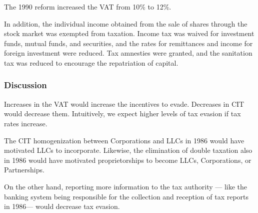 \documentclass[
  12pt]{article}
\theoremstyle{definition}
\theoremstyle{remark}
\begin{document}
The 1990 reform increased the VAT from 10\% to 12\%.

In addition, the individual income obtained from the sale of shares
through the stock market was exempted from taxation. Income tax was
waived for investment funds, mutual funds, and securities, and the rates
for remittances and income for foreign investment were reduced. Tax
amnesties were granted, and the sanitation tax was reduced to encourage
the repatriation of capital.

\subsubsection{Discussion}\label{discussion-2}

Increases in the VAT would increase the incentives to evade. Decreases
in CIT would decrease them. Intuitively, we expect higher levels of tax
evasion if tax rates increase.

The CIT homogenization between Corporations and LLCs in 1986 would have
motivated LLCs to incorporate. Likewise, the elimination of double
taxation also in 1986 would have motivated proprietorships to become
LLCs, Corporations, or Partnerships.

On the other hand, reporting more information to the tax authority ---
like the banking system being responsible for the collection and
reception of tax reports in 1986--- would decrease tax evasion.

\begin{table}

\caption{\label{tbl-cit-summary}Income Tax Reforms in Colombia
(1980-1986)}


\end{table}%
\end{document}
